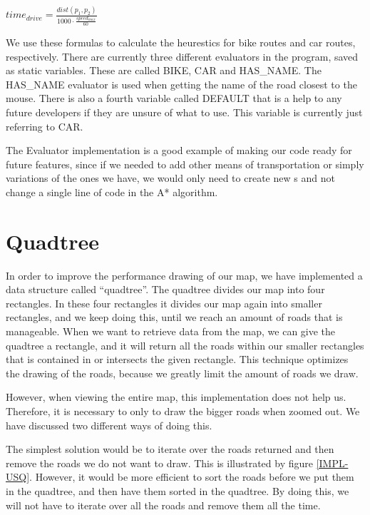 \begin{center}
$
time_{drive}=\frac{dist(p_{1},p_{2})}{1000\cdot \frac {speed_{max}}{60}}
$
\end{center}

We use these formulas to calculate the heurestics for bike routes and car
routes, respectively. There are currently three different evaluators in the
program, saved as static variables. These are called BIKE, CAR and HAS\_NAME.
The HAS\_NAME evaluator is used when getting the name of the road closest to the
mouse. There is also a fourth variable called DEFAULT that is a help to any
future developers if they are unsure of what to use. This variable is currently
just referring to CAR.

The Evaluator implementation is a good example of making our code ready for
future features, since if we needed to add other means of transportation or
simply variations of the ones we have, we would only need to create new
s and not change a single line of code in the A* algorithm.

\section{Quadtree}
\label{IMPL-QT}
In order to improve the performance drawing of our map, we have implemented a
data structure called ``quadtree''. The quadtree divides our map into four
rectangles. In these four rectangles it divides our map again into smaller
rectangles, and we keep doing this, until we reach an amount of roads that is
manageable. When we want to retrieve data from the map, we can give the quadtree
a rectangle, and it will return all the roads within our smaller rectangles that
is contained in or intersects the given rectangle. This technique optimizes the
drawing of the roads, because we greatly limit the amount of roads we draw.

However, when viewing the entire map, this implementation does not help
us. Therefore, it is necessary to only to draw the bigger roads when zoomed out.
We have discussed two different ways of doing this.

The simplest solution would be to iterate over the roads returned and then
remove the roads we do not want to draw. This is illustrated by figure
\ref{IMPL-USQ}. However, it would be more efficient to sort the roads before we
put them in the quadtree, and then have them sorted in the quadtree. By doing
this, we will not have to iterate over all the roads and remove them all the
time.


